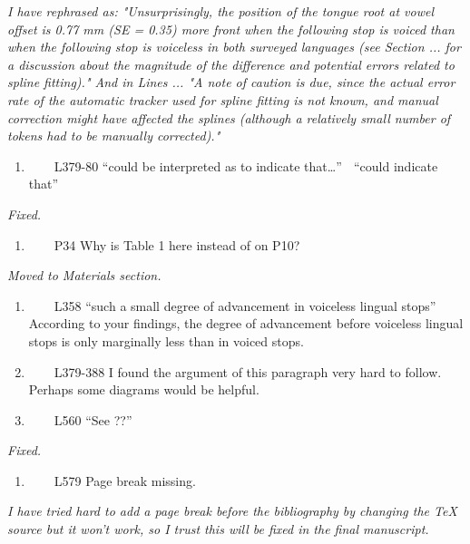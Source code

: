 \documentclass[]{article}
\providecommand{\tightlist}{%
  \setlength{\itemsep}{0pt}\setlength{\parskip}{0pt}}
\begin{document}
\begin{adjustwidth}{1cm}{} \textit{
I have rephrased as: "Unsurprisingly, the position of the tongue root at vowel offset is 0.77 mm (SE = 0.35) more front when the following stop is voiced than when the following stop is voiceless in both surveyed languages (see Section ... for a discussion about the magnitude of the difference and potential errors related to spline fitting)." And in Lines ... "A note of caution is due, since the actual error rate of the automatic tracker used for spline fitting is not known, and manual correction might have affected the splines (although a relatively small number of tokens had to be manually corrected)."
} \end{adjustwidth}

\begin{enumerate}
\def\labelenumi{\arabic{enumi}.}
\setcounter{enumi}{16}
\tightlist
\item
  ~~~~L379-80 ``could be interpreted as to indicate that\ldots{}'' 
  ``could indicate that''
\end{enumerate}

\begin{adjustwidth}{1cm}{} \textit{
Fixed.
} \end{adjustwidth}

\begin{enumerate}
\def\labelenumi{\arabic{enumi}.}
\setcounter{enumi}{17}
\tightlist
\item
  ~~~~P34 Why is Table 1 here instead of on P10?
\end{enumerate}

\begin{adjustwidth}{1cm}{} \textit{
Moved to Materials section.
} \end{adjustwidth}

\begin{enumerate}
\def\labelenumi{\arabic{enumi}.}
\setcounter{enumi}{18}
\item
  ~~~~L358 ``such a small degree of advancement in voiceless lingual
  stops'' According to your findings, the degree of advancement before
  voiceless lingual stops is only marginally less than in voiced stops.
\item
  ~~~~L379-388 I found the argument of this paragraph very hard to
  follow. Perhaps some diagrams would be helpful.
\item
  ~~~~L560 ``See ??''
\end{enumerate}

\begin{adjustwidth}{1cm}{} \textit{
Fixed.
} \end{adjustwidth}

\begin{enumerate}
\def\labelenumi{\arabic{enumi}.}
\setcounter{enumi}{21}
\tightlist
\item
  ~~~~L579 Page break missing.
\end{enumerate}

\begin{adjustwidth}{1cm}{} \textit{
I have tried hard to add a page break before the bibliography by changing the TeX source but it won't work, so I trust this will be fixed in the final manuscript.
} \end{adjustwidth}
\end{document}
